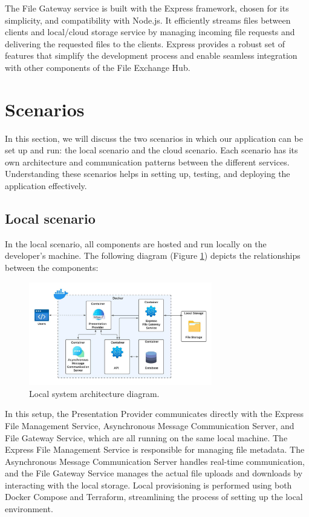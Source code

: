 \documentclass[a4paper,fleqn]{cas-dc}
\begin{document}
The File Gateway service is built with the Express framework, chosen for its simplicity, and compatibility with Node.js. It efficiently streams files between clients and local/cloud storage service by managing incoming file requests and delivering the requested files to the clients. Express provides a robust set of features that simplify the development process and enable seamless integration with other components of the File Exchange Hub.

\section{Scenarios} \label{sec:scenarios}

In this section, we will discuss the two scenarios in which our application can be set up and run: the local scenario and the cloud scenario. Each scenario has its own architecture and communication patterns between the different services. Understanding these scenarios helps in setting up, testing, and deploying the application effectively.

\subsection{Local scenario}

In the local scenario, all components are hosted and run locally on the developer's machine. The following diagram (Figure \ref{fig:architectureLocal}) depicts the relationships between the components:

\begin{figure}[htb]
\centering
\includegraphics[width=8cm]{LocalArch.jpeg}
\caption{Local system architecture diagram.}
\label{fig:architectureLocal}
\end{figure}

In this setup, the Presentation Provider communicates directly with the Express File Management Service, Asynchronous Message Communication Server, and File Gateway Service, which are all running on the same local machine. The Express File Management Service is responsible for managing file metadata. The Asynchronous Message Communication Server handles real-time communication, and the File Gateway Service manages the actual file uploads and downloads by interacting with the local storage. Local provisioning is performed using both Docker Compose and Terraform, streamlining the process of setting up the local environment.
\end{document}
